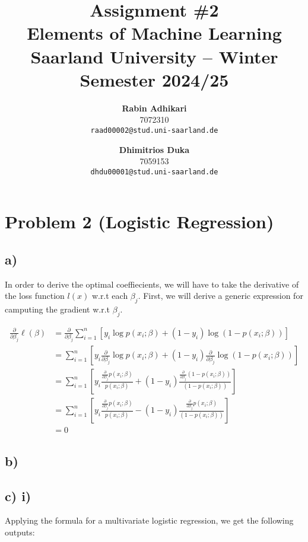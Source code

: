 \documentclass{article}
\title{Assignment \#2\\
  \vspace{2mm}
  \small{Elements of Machine Learning}
  \\
  \vspace{2mm}
  \small{Saarland University -- Winter Semester 2024/25}
}
\author{%
\textbf{Rabin Adhikari} \\
  7072310 \\
  \texttt{raad00002@stud.uni-saarland.de} \\
  \and
  \textbf{Dhimitrios Duka} \\
 7059153 \\
  \texttt{dhdu00001@stud.uni-saarland.de} \\
}
\begin{document}
\maketitle

\section*{Problem 2 (Logistic Regression)}
\subsection*{a)}
In order to derive the optimal coeffiecients, we will have to take the derivative of the loss function $l(x)$ w.r.t each $\beta_j$. First, we will derive a generic expression for camputing the gradient w.r.t $\beta_j$.

\begin{equation}
  \begin{aligned}
    \frac{\partial}{\partial \beta_j}\ell(\beta) &= \frac{\partial}{\partial \beta_j}\sum_{i=1}^{n} \left[ y_i \log p(x_i; \beta) + (1 - y_i) \log \left(1 - p(x_i; \beta) \right) \right] \\
    &= \sum_{i=1}^{n} \left[ y_i \frac{\partial}{\partial \beta_j} \log p(x_i; \beta) + (1 - y_i) \frac{\partial}{\partial \beta_j} \log \left(1 - p(x_i; \beta) \right) \right] \\
    &= \sum_{i=1}^{n} \left[ y_i \frac{\frac{\partial}{\partial \beta_j} p(x_i; \beta)}{p(x_i; \beta)} + (1 - y_i) \frac{\frac{\partial}{\partial \beta_j}(1 - p(x_i; \beta))}{(1 - p(x_i; \beta))} \right] \\
    &= \sum_{i=1}^{n} \left[ y_i \frac{\frac{\partial}{\partial \beta_j} p(x_i; \beta)}{p(x_i; \beta)} - (1 - y_i) \frac{\frac{\partial}{\partial \beta_j}p(x_i; \beta)}{(1 - p(x_i; \beta))} \right] \\
    &= 0
  \end{aligned}
\end{equation}

\subsection*{b)}


\subsection*{c) i)} 
Applying the formula for a multivariate logistic regression, we get the following outputs:
\end{document}
